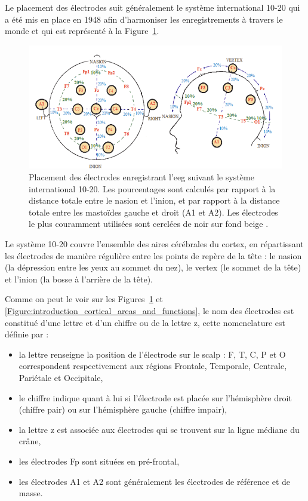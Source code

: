 Le placement des électrodes suit généralement le système international 10-20 qui a été mis en place en 1948 afin d'harmoniser les enregistrements à travers le monde 
\citep{Jasper1949, Sharbrough1991} et qui est représenté à la Figure~\ref{Figure:introduction_system_10_20}.

\begin{figure}[h!]
  \centering
	\includegraphics[width=1\linewidth]{figures/chapter-1/introduction-system-10-20} 
  \caption[Placement des électrodes enregistrant l'\gls{eeg} suivant le système international 10-20.]{Placement des électrodes enregistrant l'\gls{eeg} suivant le système international 10-20. 
	Les pourcentages sont calculés par rapport à la distance totale entre le nasion
	et l'inion, et par rapport à la distance totale entre les mastoïdes gauche et droit (A1 et A2). Les électrodes le plus couramment utilisées 
	sont cerclées de noir sur fond beige \citep{Marzbani2016}.}
  \label{Figure:introduction_system_10_20}
\end{figure}

Le système 10-20 couvre l'ensemble des aires cérébrales du cortex, en répartissant les électrodes de manière régulière entre les points de repère de la tête : le nasion (la 
dépression entre les yeux au sommet du nez), le vertex (le sommet de la tête) et l'inion (la bosse à l'arrière de la tête). 

Comme on peut le voir sur les Figures~\ref{Figure:introduction_system_10_20} et \ref{Figure:introduction_cortical_areas_and_functions}, le nom des électrodes est 
constitué d'une lettre et d'un chiffre ou de la lettre z, cette nomenclature est définie par \citet{Jasper1949} :
\begin{itemize}
\item la lettre renseigne la position de l'électrode sur le scalp : F, T, C, P et O correspondent respectivement aux régions Frontale, Temporale, Centrale, Pariétale et Occipitale,
\item le chiffre indique quant à lui si l'électrode est placée sur l'hémisphère droit (chiffre pair) ou sur l'hémisphère gauche (chiffre impair),
\item la lettre z est associée aux électrodes qui se trouvent sur la ligne médiane du crâne,
\item les électrodes Fp sont situées en pré-frontal,
\item les électrodes A1 et A2 sont généralement les électrodes de référence et de masse.
\end{itemize}
  
